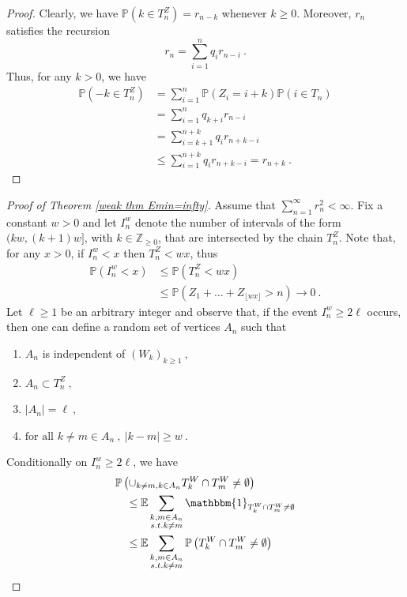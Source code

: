 \documentclass[12pt]{article}
\newcommand{\Z}{\mathbb{Z}}
\newcommand{\E}{\mathbb{E}}
\numberwithin{equation}{section} \font\titre=cmbx12
\def\IND{\mathbbm{1}}
\newcommand{\prob}[1]{\mathbb{P}\left( #1 \right)}
\begin{document}
\begin{proof}
    Clearly, we have $\prob{k\in T_n^Z}=r_{n-k}$ whenever $k\ge 0$. Moreover, $r_n$ satisfies the recursion $$r_n=\sum_{i=1}^n q_i r_{n-i}~.$$
    Thus, for any $k>0$, we have
    \begin{align*}
        \prob{-k\in T_n^Z} &= \sum_{i=1}^n \prob{Z_i=i+k}\prob{i\in T_n} \\
        &= \sum_{i=1}^n q_{k+i}r_{n-i}\\
        &= \sum_{i=k+1}^{n+k} q_{i}r_{n+k-i} \\
        &\le  \sum_{i=1}^{n+k} q_{i}r_{n+k-i} = r_{n+k}~.
    \end{align*}
\end{proof}
\begin{proof}[Proof of Theorem \ref{weak thm Emin=infty}]
    Assume that $\sum_{n=1}^\infty r_n^2 <\infty$. Fix a constant $w>0$ and let $I_n^w$ denote the number of intervals of the form $(kw,(k+1)w]$, with $k\in \Z_{\ge 0}$, that are intersected by the chain $T_n^Z$. Note that, for any $x>0$, if $I_n^w < x$ then $T_n^Z < wx $, thus 
    \begin{align}
        \prob{I_n^w<x} &\le \prob{T_n^Z < wx} \nonumber \\
        &\le \prob{Z_1+\dots + Z_{\lfloor wx \rfloor}>n}\to 0 ~. \label{I_n goes to infty}
    \end{align}
    Let $\ell \ge 1$ be an arbitrary integer and observe that, if the event $I_n^w \ge 2\ell$ occurs, then one can define a random set of vertices $A_n$ such that
    \begin{enumerate}%
        \item $A_n$ is independent of $(W_k)_{k\ge 1}~,$
        \item $A_n\subset T_n^Z~,$
        \item $|A_n|=\ell~,$
        \item $\text{for all } k\neq m \in A_n~,~|k-m|\ge w~.$
    \end{enumerate}
    Conditionally on $I_n^w\ge 2\ell$, we have
    \begin{align}
        &\prob{\cup_{k\neq m, k \in A_n}  T_k^W\cap T_m^W\neq \emptyset} \\
        &\quad\le \E \sum_{\substack{k,m\in A_n \\ \textit{s.t. } k\neq m} } \IND_{T_k^W\cap T_m^W \neq \emptyset} \nonumber \\
        &\quad\le \E \sum_{\substack{k,m\in A_n \\ \textit{s.t. } k\neq m} } \prob{T_k^W\cap T_m^W \neq \emptyset} \nonumber \\

\end{align}
\end{proof}
\end{document}
